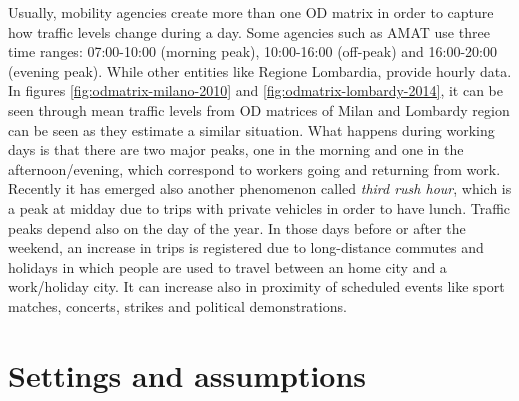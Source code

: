 Usually, mobility agencies create more than one OD matrix in order to capture how traffic levels change during a day.
Some agencies such as AMAT use three time ranges: 07:00-10:00 (morning peak), 10:00-16:00 (off-peak) and 16:00-20:00 (evening peak). 
While other entities like Regione Lombardia, provide hourly data.
In figures \ref{fig:odmatrix-milano-2010} and \ref{fig:odmatrix-lombardy-2014}, it can be seen through mean traffic levels from OD matrices of Milan and Lombardy region can be seen as they estimate a similar situation.
What happens during working days is that there are two major peaks, one in the morning and one in the afternoon/evening, which correspond to workers going and returning from work.
Recently it has emerged also another phenomenon called \textit{third rush hour}, which is a peak at midday due to trips with private vehicles in order to have lunch.
Traffic peaks depend also on the day of the year. In those days before or after the weekend, an increase in trips is registered due to long-distance commutes and holidays in which people are used to travel between an home city and a work/holiday city. It can increase also in proximity of scheduled events like sport matches, concerts, strikes and political demonstrations.


\section{Settings and assumptions}

